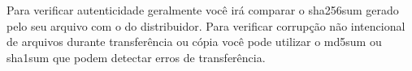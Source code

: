 \documentclass[12pt,a4paper]{article}
\begin{document}
\vspace{\baselineskip}

Para verificar autenticidade geralmente você irá comparar o sha256sum gerado pelo seu arquivo com o do distribuidor. Para verificar corrupção não intencional de arquivos durante transferência ou cópia você pode utilizar o md5sum ou sha1sum que podem detectar erros de transferência. \\    

\hspace{\baselineskip}



















\end{document}
